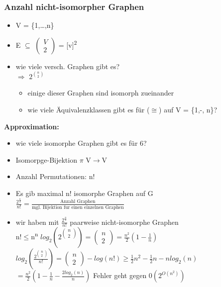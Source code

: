 \subsubsection{Anzahl nicht-isomorpher Graphen}
\begin{itemize}
	\item V = \{1,\ldots,n\}
	\item E $\subseteq$ $\left(\begin{array}{c} V \\ 2 \end{array}\right)$ = [v]\textsuperscript{2}
	\item wie viele versch. Graphen gibt es?\\ $\Rightarrow$ $2^{\binom{n}{2}}$
	\begin{itemize}
		\item einige dieser Graphen sind isomorph zueinander
		\item wie viele Äquivalenzklassen gibt es für ($\cong$) auf V = \{1,-, n\}?
	\end{itemize}
\end{itemize}

\textbf{Approximation:}\newline
\begin{itemize}
	\item wie viele isomorphe Graphen gibt es für 6?
	\item Isomorpge-Bijektion $\pi$ V$\rightarrow$V
	\item Anzahl Permutationen: n!
	\item Es gib maximal n! isomorphe Graphen auf G\\
	
\hspace*{2cm}$\frac{2^\frac{n}{2}}{n!}=\frac{\text{Anzahl Graphen}}{\text{mgl. Bijektion fur einen einzelnen Graphen}}$\\
	\item wir haben mit $\frac{2^\frac{n}{2}}{n!}$ paarweise nicht-isomorphe Graphen\\
\hspace*{2cm}n!$\leq$n\textsuperscript{n}\newline
\hspace*{2cm}$log_2(2^{\begin{pmatrix}n\\2\end{pmatrix}}) = \begin{pmatrix}n\\2\end{pmatrix} = \frac{n^2}{2}(1-\frac{1}{n})$\newline
$log_2(\frac{2^{\begin{pmatrix}n\\2\end{pmatrix}}}{n!}) = \begin{pmatrix}n\\2\end{pmatrix} - log(n!) \geq \frac{1}{2}n^2-\frac{1}{2}n-n log_2(n)$\newline
\hspace*{5.2cm}$=\frac{n^2}{2}(1-\frac{1}{n}-\frac{2 log_2(n)}{n})$\newline
Fehler geht gegen $0 (2^{O(n^2)})$
\end{itemize}

